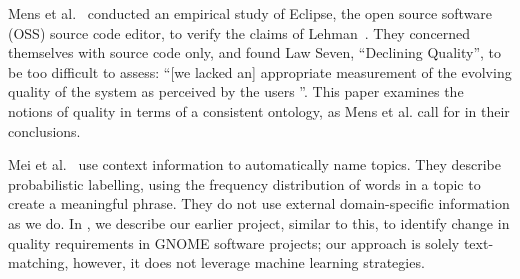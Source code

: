 \documentclass[]{sig-alternate}
\begin{document}

Mens et al.~\cite{mens08icsm} conducted an empirical study of Eclipse, the open source software (OSS) source code editor, to verify the claims of Lehman~\cite{lehman97sms}. They concerned themselves with source code only, and found Law Seven, ``Declining Quality'', to be too difficult to assess: ``[we lacked an] appropriate measurement of the evolving quality of the system as perceived by the users \cite[p. 388]{mens08icsm}''. This paper examines the notions of quality in terms of a consistent ontology, as Mens et al. call for in their conclusions.

Mei et al.~\cite{Mei2007} use context information to automatically name topics. They describe probabilistic labelling, using the frequency distribution of words in a topic to create a meaningful phrase. They do not use external domain-specific information as we do.
In \cite{ernst10refsq}, we describe our earlier project, similar to this, to identify change in quality requirements in GNOME software projects; our approach is solely text-matching, however, it does not leverage machine learning strategies.

\end{document}
